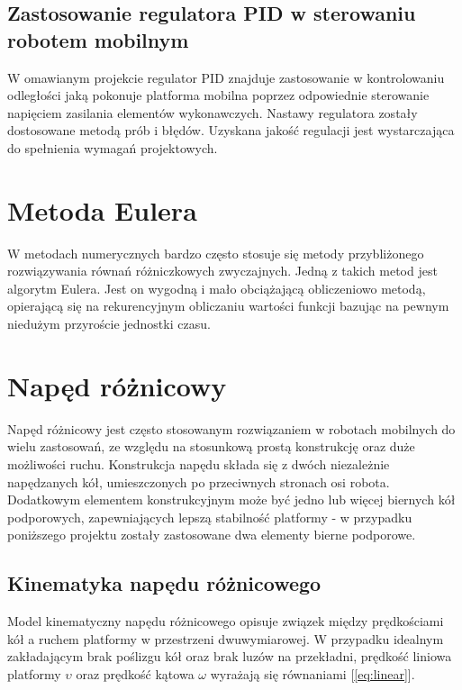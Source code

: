 \subsection{Zastosowanie regulatora PID w sterowaniu robotem mobilnym}

W omawianym projekcie regulator PID znajduje zastosowanie w kontrolowaniu odległości jaką pokonuje platforma mobilna poprzez odpowiednie sterowanie napięciem zasilania elementów wykonawczych. Nastawy regulatora zostały dostosowane metodą prób i błędów. Uzyskana jakość regulacji jest wystarczająca do spełnienia wymagań projektowych. 

\section{Metoda Eulera}

W metodach numerycznych bardzo często stosuje się metody przybliżonego rozwiązywania równań różniczkowych zwyczajnych. Jedną z takich metod jest algorytm Eulera. Jest on wygodną i mało obciążającą obliczeniowo metodą, opierającą się na rekurencyjnym obliczaniu wartości funkcji bazując na pewnym niedużym przyroście jednostki czasu. 



\section{Napęd różnicowy}

Napęd różnicowy jest często stosowanym rozwiązaniem w robotach mobilnych do wielu zastosowań, ze względu na stosunkową prostą konstrukcję oraz duże możliwości ruchu.  Konstrukcja napędu składa się z dwóch niezależnie napędzanych kół, umieszczonych po przeciwnych stronach osi robota. Dodatkowym elementem konstrukcyjnym może być jedno lub więcej biernych kół podporowych, zapewniających lepszą stabilność platformy - w przypadku poniższego projektu zostały zastosowane dwa elementy bierne podporowe. 

\subsection{Kinematyka napędu różnicowego}

Model kinematyczny napędu różnicowego opisuje związek między prędkościami kół a ruchem platformy w przestrzeni dwuwymiarowej. W przypadku idealnym zakładającym brak poślizgu kół oraz brak luzów na przekładni, prędkość liniowa platformy \(\upsilon\) oraz prędkość kątowa \(\omega\) wyrażają się równaniami [\ref{eq:linear}].

